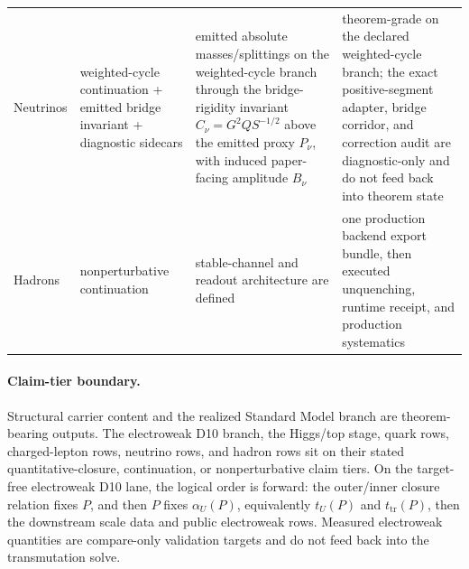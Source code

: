 \begin{longtable}{@{}>{\raggedright\arraybackslash}p{}>{\raggedright\arraybackslash}p{}>{\raggedright\arraybackslash}p{}>{\raggedright\arraybackslash}p{}@{}}
Neutrinos & weighted-cycle continuation + emitted bridge invariant + diagnostic sidecars & emitted absolute masses/splittings on the weighted-cycle branch through the bridge-rigidity invariant \(C_\nu=G^2Q S^{-1/2}\) above the emitted proxy \(P_\nu\), with induced paper-facing amplitude \(B_\nu\) & theorem-grade on the declared weighted-cycle branch; the exact positive-segment adapter, bridge corridor, and correction audit are diagnostic-only and do not feed back into theorem state \\
Hadrons & nonperturbative continuation & stable-channel and readout architecture are defined & one production backend export bundle, then executed unquenching, runtime receipt, and production systematics \\
\end{longtable}
\normalsize

\paragraph{Claim-tier boundary.}
Structural carrier content and the realized Standard Model branch are theorem-bearing outputs.
The electroweak D10 branch, the Higgs/top stage, quark rows, charged-lepton rows, neutrino rows, and
hadron rows sit on their stated quantitative-closure, continuation, or nonperturbative claim tiers.
On the target-free electroweak D10 lane, the logical order is forward: the outer/inner closure relation fixes \(P\), and then \(P\) fixes \(\alpha_U(P)\),
equivalently \(t_U(P)\) and \(t_{\mathrm{tr}}(P)\), then the downstream scale data and public
electroweak rows. Measured electroweak quantities are compare-only validation targets and do
not feed back into the transmutation solve.

